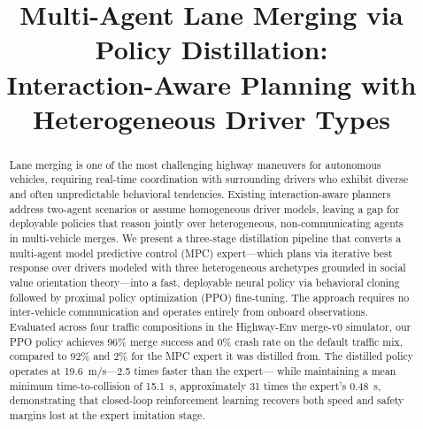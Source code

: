 \documentclass[conference]{IEEEtran}
\begin{document}
\title{Multi-Agent Lane Merging via Policy Distillation:\\
Interaction-Aware Planning with Heterogeneous Driver Types}

\author{
\and
{}
\and
{}
}

\maketitle

\begin{abstract}
Lane merging is one of the most challenging highway maneuvers for autonomous
vehicles, requiring real-time coordination with surrounding drivers who exhibit
diverse and often unpredictable behavioral tendencies.
Existing interaction-aware planners address two-agent scenarios or assume
homogeneous driver models, leaving a gap for deployable policies that reason
jointly over heterogeneous, non-communicating agents in multi-vehicle merges.
We present a three-stage distillation pipeline that converts a multi-agent
model predictive control (MPC) expert---which plans via iterative best response
over drivers modeled with three heterogeneous archetypes grounded in social
value orientation theory---into a fast, deployable neural policy via behavioral
cloning followed by proximal policy optimization (PPO) fine-tuning.
The approach requires no inter-vehicle communication and operates entirely from
onboard observations.
Evaluated across four traffic compositions in the Highway-Env merge-v0 simulator,
our PPO policy achieves 96\% merge success and 0\% crash rate on the default
traffic mix, compared to 92\% and 2\% for the MPC expert it was distilled from.
The distilled policy operates at 19.6~m/s---2.5 times faster than the expert---
while maintaining a mean minimum time-to-collision of 15.1~s, approximately 31
times the expert's 0.48~s, demonstrating that closed-loop reinforcement learning
recovers both speed and safety margins lost at the expert imitation stage.
\end{abstract}
\end{document}
